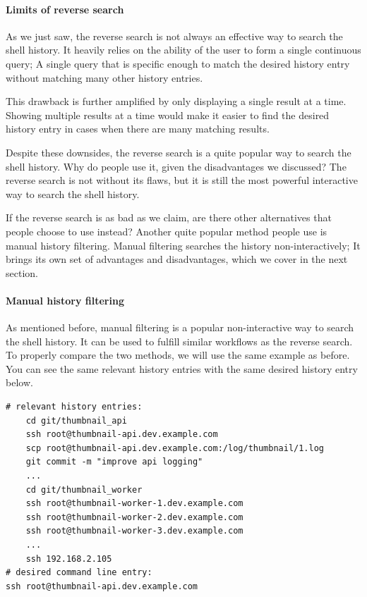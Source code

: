 \paragraph{Limits of reverse search}

As we just saw, the reverse search is not always an effective way to search the shell history. It heavily relies on the ability of the user to form a single continuous query; A single query that is specific enough to match the desired history entry without matching many other history entries. 

This drawback is further amplified by only displaying a single result at a time. Showing multiple results at a time would make it easier to find the desired history entry in cases when there are many matching results. 

Despite these downsides, the reverse search is a quite popular way to search the shell history. Why do people use it, given the disadvantages we discussed? The reverse search is not without its flaws, but it is still the most powerful interactive way to search the shell history. %

If the reverse search is as bad as we claim, are there other alternatives that people choose to use instead? Another quite popular method people use is manual history filtering. Manual filtering searches the history non-interactively; It brings its own set of advantages and disadvantages, which we cover in the next section.


\paragraph{Manual history filtering}

As mentioned before, manual filtering is a popular non-interactive way to search the shell history. It can be used to fulfill similar workflows as the reverse search. To properly compare the two methods, we will use the same example as before. You can see the same relevant history entries with the same desired history entry below.


\begin{verbatim}
# relevant history entries:
    cd git/thumbnail_api
    ssh root@thumbnail-api.dev.example.com
    scp root@thumbnail-api.dev.example.com:/log/thumbnail/1.log
    git commit -m "improve api logging"
    ...
    cd git/thumbnail_worker
    ssh root@thumbnail-worker-1.dev.example.com
    ssh root@thumbnail-worker-2.dev.example.com
    ssh root@thumbnail-worker-3.dev.example.com
    ...
    ssh 192.168.2.105
# desired command line entry:
ssh root@thumbnail-api.dev.example.com
\end{verbatim}

